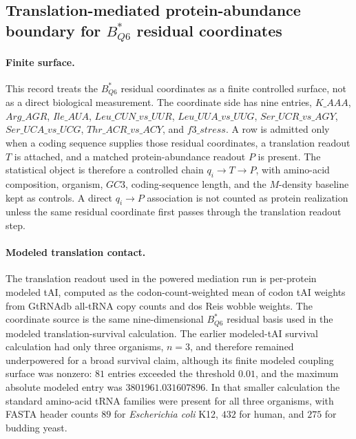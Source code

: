 \subsection{Translation-mediated protein-abundance boundary for $B^{\ast}_{Q6}$ residual coordinates}
\label{sec:q6-translation-mediated-protein-abundance-cross-layer}

\paragraph{Finite surface.}
This record treats the $B^{\ast}_{Q6}$ residual coordinates as a finite controlled surface, not as a direct biological measurement.  The coordinate side has nine entries,
$K\_AAA$, $Arg\_AGR$, $Ile\_AUA$, $Leu\_CUN\_vs\_UUR$, $Leu\_UUA\_vs\_UUG$, $Ser\_UCR\_vs\_AGY$, $Ser\_UCA\_vs\_UCG$, $Thr\_ACR\_vs\_ACY$, and $f3\_stress$.  A row is admitted only when a coding sequence supplies those residual coordinates, a translation readout $T$ is attached, and a matched protein-abundance readout $P$ is present.  The statistical object is therefore a controlled chain $q_i \to T \to P$, with amino-acid composition, organism, $GC3$, coding-sequence length, and the $M$-density baseline kept as controls.  A direct $q_i \to P$ association is not counted as protein realization unless the same residual coordinate first passes through the translation readout step.

\paragraph{Modeled translation contact.}
The translation readout used in the powered mediation run is per-protein modeled tAI, computed as the codon-count-weighted mean of codon tAI weights from GtRNAdb all-tRNA copy counts and dos Reis wobble weights.  The coordinate source is the same nine-dimensional $B^{\ast}_{Q6}$ residual basis used in the modeled translation-survival calculation.  The earlier modeled-tAI survival calculation had only three organisms, $n=3$, and therefore remained underpowered for a broad survival claim, although its finite modeled coupling surface was nonzero: $81$ entries exceeded the threshold $0.01$, and the maximum absolute modeled entry was $3801961.031607896$.  In that smaller calculation the standard amino-acid tRNA families were present for all three organisms, with FASTA header counts $89$ for \emph{Escherichia coli} K12, $432$ for human, and $275$ for budding yeast.

